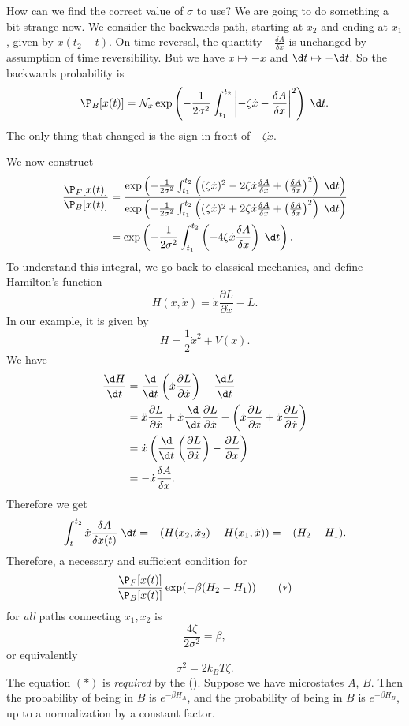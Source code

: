 \documentclass[a4paper]{article}
\begin{document}
How can we find the correct value of $\sigma$ to use? We are going to do something a bit strange now. We consider the backwards path, starting at $x_2$ and ending at $x_1$, given by $x(t_2 - t)$. On time reversal, the quantity $-\frac{\delta A}{\delta x}$ is unchanged by assumption of time reversibility. But we have $\dot{x} \mapsto -\dot{x}$ and $\d t \mapsto - \d t$. So the backwards probability is
\[
  \P_B[x(t)] = \mathcal{N}_x \exp \left( - \frac{1}{2\sigma^2}\int_{t_1}^{t_2} \left|-\zeta\dot{x} - \frac{\delta A}{\delta x}\right|^2\right)\;\d t.
\]
The only thing that changed is the sign in front of $- \zeta \dot{x}$.

We now construct
\begin{align*}
  \frac{\P_F[x(t)]}{\P_B[x(t)]} &= \frac{\exp \left(-\frac{1}{2\sigma^2} \int_{t_1}^{t_2} \left((\zeta \dot{x})^2 - 2 \zeta \dot{x} \frac{\delta A}{\delta x} + \left(\frac{\delta A}{\delta x}\right)^2\right)\;\d t\right)}{\exp \left(-\frac{1}{2\sigma^2} \int_{t_1}^{t_2} \left((\zeta \dot{x})^2 + 2 \zeta \dot{x} \frac{\delta A}{\delta x} + \left(\frac{\delta A}{\delta x}\right)^2\right)\;\d t\right)}\\
  &= \exp \left(-\frac{1}{2\sigma^2} \int_{t_1}^{t_2} \left(-4 \zeta \dot{x} \frac{\delta A}{\delta x}\right)\;\d t\right).
\end{align*}
To understand this integral, we go back to classical mechanics, and define Hamilton's function
\[
  H(x, \dot{x}) = \dot{x} \frac{\partial L}{\partial \dot{x}} - L.
\]
In our example, it is given by
\[
  H = \frac{1}{2} \dot{x}^2 + V(x).
\]
We have
\begin{align*}
  \frac{\d H}{\d t} &= \frac{\d}{\d t} \left(\dot{x} \frac{\partial L}{\partial \dot{x}}\right) - \frac{\d L}{\d t} \\
  &= \ddot{x} \frac{\partial L}{\partial \dot{x}} + \dot{x} \frac{\d}{\d t} \frac{\partial L}{\partial \dot{x}} - \left(\dot{x} \frac{\partial L}{\partial x} + \ddot{x} \frac{\partial L}{\partial \dot{x}}\right)\\
  &= \dot{x}\left(\frac{\d}{\d t} \left(\frac{\partial L}{\partial \dot{x}}\right) - \frac{\partial L}{\partial x}\right)\\
  &= - \dot{x} \frac{\delta A}{\delta x}.
\end{align*}
Therefore we get
\[
  \int_t^{t_2} \dot{x} \frac{\delta A}{\delta x(t)}\;\d t = - (H(x_2, \dot{x}_2) - H(x_1, \dot{x})) = - (H_2 - H_1).
\]
Therefore, a necessary and sufficient condition for
\[
  \frac{\P_F[x(t)]}{\P_B[x(t)]} \exp (-\beta(H_2 - H_1))\tag{$*$}
\]
for \emph{all} paths connecting $x_1, x_2$ is
\[
  \frac{4 \zeta}{2\sigma^2} = \beta,
\]
or equivalently
\[
  \sigma^2 = 2k_B T \zeta.
\]
The equation $(*)$ is \emph{required} by the  (). Suppose we have microstates $A$, $B$. Then the probability of being in $B$ is $e^{-\beta H_A}$, and the probability of being in $B$ is $e^{-\beta H_B}$, up to a normalization by a constant factor.
\end{document}

